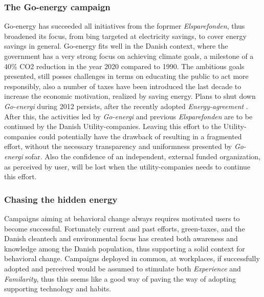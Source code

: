 \documentclass[journal]{IEEEtran}
\begin{document}
\subsubsection{The Go-energy campaign}
Go-energy has succeeded all initiatives from the foprmer \textit{Elsparefonden}, thus broadened its focus, from bing targeted at electricity savings, to cover energy savings in general. Go-energy fits well in the Danish context, where the government has a very strong focus on achieving climate goals, a milestone of a 40\% CO2 reduction in the year 2020 compared to 1990. The ambitious goals presented, still posses challenges in terms on educating the public to act more responsibly, also a number of taxes have been introduced the last decade to increase the economic motivation, realized by saving energy. 
Plans to shut down \textit{Go-energi} during 2012 \cite{luk_ge} persists, after the recently adopted \textit{Energy-agreement} \cite{energipolitik_2020}. After this, the activities led by \textit{Go-energi} and previous \textit{Elsparefonden} are to be continued by the Danish Utility-companies.
Leaving this effort to the Utility-companies could potentially have the drawback of resulting in a fragmented effort, without the necessary transparency and uniformness presented by \textit{Go-energi} sofar. Also the confidence of an independent, external funded organization, as perceived by user, will be lost when the utility-companies needs to continue this effort. 

\subsubsection{Chasing the hidden energy}
Campaigns aiming at behavioral change always requires motivated users to become successful. Fortunately current and past efforts, green-taxes, and the Danish cleantech and environmental focus has created both awareness and knowledge among the Danish population, thus supporting a solid context for behavioral change. Campaigns deployed in common, at workplaces, if successfully adopted and perceived would be assumed to stimulate both \textit{Experience} and \textit{Familarity}, thus this seems like a good way of paving the way of adopting supporting technology and habits. 
\end{document}

